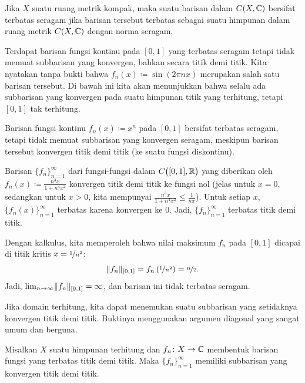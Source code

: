 Jika $X$ suatu ruang metrik kompak, maka suatu barisan dalam $C(X,{\mathbb{C}})$
bersifat terbatas seragam jika barisan tersebut terbatas sebagai suatu himpunan dalam ruang metrik
$C(X,{\mathbb{C}})$ dengan norma seragam.

\begin{example}
Terdapat barisan
fungsi kontinu
pada $[0,1]$ yang terbatas seragam tetapi tidak memuat subbarisan yang konvergen,
bahkan secara titik demi titik.
Kita nyatakan tanpa bukti bahwa $f_n(x) \coloneqq \sin (2\pi n x)$ merupakan salah satu
barisan tersebut.
Di bawah ini kita akan menunjukkan bahwa selalu ada
subbarisan yang konvergen pada suatu himpunan titik
yang terhitung, tetapi $[0,1]$ tak terhitung.
\end{example}

\begin{example}
Barisan fungsi kontinu $f_n(x) \coloneqq x^n$ pada $[0,1]$
bersifat terbatas seragam, tetapi tidak memuat subbarisan yang konvergen
seragam,
meskipun barisan tersebut konvergen titik demi titik (ke suatu fungsi diskontinu).
\end{example}

\begin{example}
Barisan $\{ f_n \}_{n=1}^\infty$ dari fungsi-fungsi dalam $C\bigl([0,1],{\mathbb{R}}\bigr)$ yang diberikan oleh
$f_n(x) \coloneqq \frac{n^3x}{1+n^4x^2}$
konvergen titik demi titik ke fungsi nol (jelas untuk $x=0$, sedangkan untuk $x > 0$,
kita mempunyai $\frac{n^3x}{1+n^4x^2} \leq \frac{1}{nx}$).
Untuk setiap $x$, $\{f_n(x)\}_{n=1}^\infty$ terbatas karena konvergen ke 0.
Jadi, $\{ f_n \}_{n=1}^\infty$ terbatas titik demi titik.

Dengan kalkulus, kita memperoleh bahwa nilai maksimum
$f_n$ pada
$[0,1]$ dicapai di titik kritis
$x=\nicefrac{1}{n^2}$:
\begin{equation*}
\lVert {f_n} \rVert_{[0,1]}
=
f_n\left(\nicefrac{1}{n^2}\right)
= \nicefrac{n}{2} .
\end{equation*}
Jadi, $\lim_{n\to\infty} \lVert {f_n} \rVert_{[0,1]} = \infty$, dan
barisan ini tidak terbatas seragam.
\end{example}

Jika domain terhitung, kita dapat menemukan suatu subbarisan
yang setidaknya konvergen titik demi titik.
Buktinya menggunakan argumen diagonal yang sangat umum dan berguna.

\begin{prop} \label{prop:subsequenceoncountableX}
Misalkan $X$ suatu himpunan terhitung dan $f_n \colon X \to {\mathbb{C}}$ membentuk
barisan fungsi yang terbatas titik demi titik.  Maka $\{ f_n \}_{n=1}^\infty$ memiliki subbarisan yang konvergen
titik demi titik.
\end{prop}

